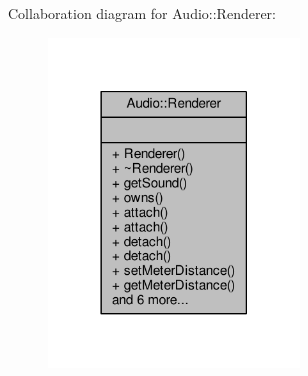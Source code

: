 Collaboration diagram for Audio\+:\+:Renderer\+:
\nopagebreak
\begin{figure}[H]
\begin{center}
\leavevmode
\includegraphics[width=189pt]{d2/d62/classAudio_1_1Renderer__coll__graph}
\end{center}
\end{figure}
